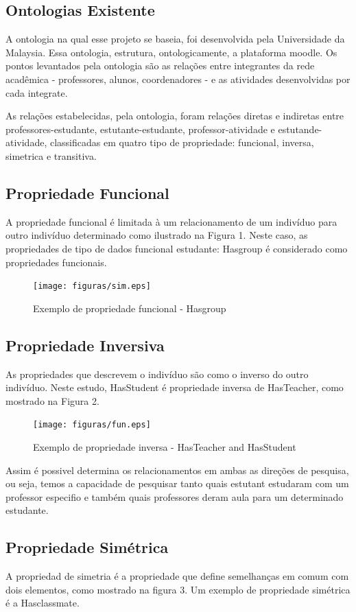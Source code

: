 \subsection{Ontologias Existente}
A ontologia na qual esse projeto se baseia, foi desenvolvida pela Universidade da Malaysia. Essa ontologia, estrutura, ontologicamente, a plataforma moodle. Os pontos levantados pela ontologia são as relações entre integrantes da rede acadêmica - professores, alunos, coordenadores - e as atividades desenvolvidas por cada integrate.

As relações estabelecidas, pela ontologia, foram relações diretas e indiretas entre professores-estudante, estutante-estudante, professor-atividade e estutande-atividade, classificadas em quatro tipo de propriedade: funcional, inversa, simetrica e transitiva. 

\subsection{Propriedade Funcional}
A propriedade funcional é limitada à um relacionamento de um indivíduo para outro indivíduo determinado como ilustrado na Figura 1. Neste caso, as propriedades de tipo de dados funcional estudante: Hasgroup é considerado como propriedades funcionais. 


 \begin{figure}[ht]
  \centering
    \texttt{[image: figuras/sim.eps]}
  \caption{Exemplo de propriedade funcional - Hasgroup}
\end{figure}


\subsection{Propriedade Inversiva}
As propriedades que descrevem o indivíduo são como o inverso do outro indivíduo. Neste estudo, HasStudent é propriedade inversa de HasTeacher, como mostrado na Figura 2.

 \begin{figure}[ht]
  \centering
    \texttt{[image: figuras/fun.eps]}
  \caption{Exemplo de propriedade inversa - HasTeacher and HasStudent}
\end{figure}

Assim é possivel determina os relacionamentos em ambas as direções de pesquisa, ou seja, temos a capacidade de pesquisar tanto quais estutant estudaram com um professor especifio e também quais professores deram aula para um determinado estudante.

\subsection{Propriedade Simétrica}
A propriedad de simetria é a propriedade que define semelhanças em comum com dois elementos, como mostrado na figura 3. Um exemplo de propriedade simétrica é a Hasclassmate.


